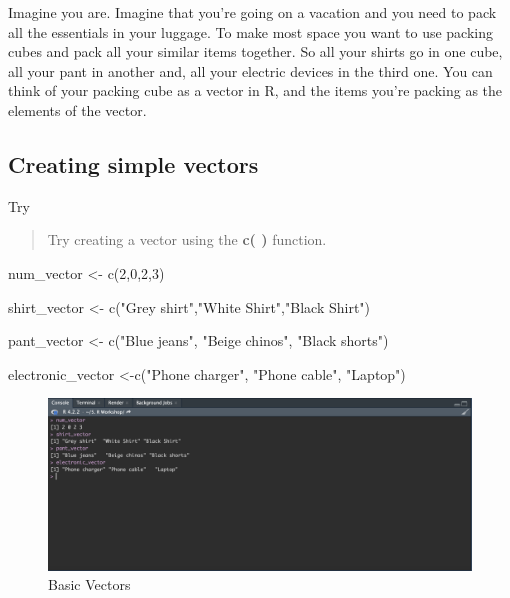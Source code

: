 \documentclass[
]{book}
\newenvironment{Shaded}{\begin{snugshade}}{\end{snugshade}}
\newcommand{\DecValTok}[1]{\textcolor[rgb]{0.00,0.00,0.81}{#1}}
\newcommand{\FunctionTok}[1]{\textcolor[rgb]{0.00,0.00,0.00}{#1}}
\newcommand{\NormalTok}[1]{#1}
\newcommand{\OtherTok}[1]{\textcolor[rgb]{0.56,0.35,0.01}{#1}}
\newcommand{\StringTok}[1]{\textcolor[rgb]{0.31,0.60,0.02}{#1}}
\begin{document}
Imagine you are. Imagine that you're going on a vacation and you need to pack all the essentials in your luggage. To make most space you want to use packing cubes and pack all your similar items together. So all your shirts go in one cube, all your pant in another and, all your electric devices in the third one. You can think of your packing cube as a vector in R, and the items you're packing as the elements of the vector.

\hypertarget{creating-simple-vectors}{%
\subsection{Creating simple vectors}\label{creating-simple-vectors}}

Try

\begin{quote}
Try creating a vector using the \textbf{c( )} function.
\end{quote}

\begin{Shaded}
\begin{Highlighting}[]
\NormalTok{num\_vector }\OtherTok{\textless{}{-}} \FunctionTok{c}\NormalTok{(}\DecValTok{2}\NormalTok{,}\DecValTok{0}\NormalTok{,}\DecValTok{2}\NormalTok{,}\DecValTok{3}\NormalTok{)}

\NormalTok{shirt\_vector }\OtherTok{\textless{}{-}} \FunctionTok{c}\NormalTok{(}\StringTok{"Grey shirt"}\NormalTok{,}\StringTok{"White Shirt"}\NormalTok{,}\StringTok{"Black Shirt"}\NormalTok{)}

\NormalTok{pant\_vector }\OtherTok{\textless{}{-}} \FunctionTok{c}\NormalTok{(}\StringTok{"Blue jeans"}\NormalTok{, }\StringTok{"Beige chinos"}\NormalTok{, }\StringTok{"Black shorts"}\NormalTok{)}

\NormalTok{electronic\_vector }\OtherTok{\textless{}{-}}\FunctionTok{c}\NormalTok{(}\StringTok{"Phone charger"}\NormalTok{, }\StringTok{"Phone cable"}\NormalTok{, }\StringTok{"Laptop"}\NormalTok{)}
\end{Highlighting}
\end{Shaded}

\begin{figure}
\includegraphics[width=29.25in]{images/3.5vectorconsole} \caption{Basic Vectors}\label{fig:unnamed-chunk-18}
\end{figure}
\end{document}
